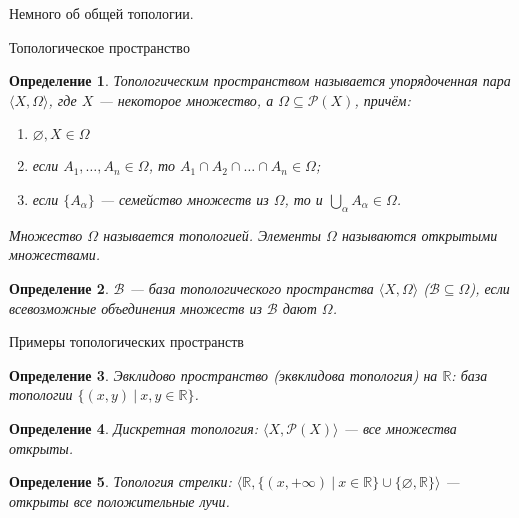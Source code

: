 \documentclass[aspectratio=169]{beamer}
\begin{document}
\newtheorem{axiom}{Аксиома}
\newtheorem{exmprus}{Пример}
\newtheorem{defrus}{Определение}
\newtheorem{lemmarus}{Лемма}
\newtheorem{thmrus}{Теорема}

\begin{frame}{}
\begin{center}\Large Немного об общей топологии.\end{center}
\end{frame}

\begin{frame}{Топологическое пространство}

\begin{defrus}Топологическим пространством называется упорядоченная пара $\langle X, \Omega \rangle$,
где $X$ --- некоторое множество, а $\Omega \subseteq \mathcal{P}(X)$, причём:
\begin{enumerate}
\item $\varnothing, X \in \Omega$
\item если $A_1, \dots, A_n \in \Omega$, то $A_1 \cap A_2 \cap \dots \cap A_n \in \Omega$;
\item если $\{A_\alpha\}$ --- семейство множеств из $\Omega$, то и $\bigcup_\alpha A_\alpha \in \Omega$.
\end{enumerate}

Множество $\Omega$ называется \emph{топологией}.
Элементы $\Omega$ называются открытыми множествами.
\end{defrus}


\begin{defrus}$\mathcal{B}$ --- \emph{база} топологического пространства $\langle X, \Omega\rangle$ ($\mathcal{B} \subseteq \Omega$), 
если всевозможные объединения множеств из $\mathcal{B}$ дают $\Omega$.
\end{defrus}
\end{frame}

\begin{frame}{Примеры топологических пространств}
\begin{defrus}Эвклидово пространство (эквклидова топология) на $\mathbb{R}$: база топологии $\{(x,y)\ |\ x,y \in \mathbb{R}\}$.\end{defrus}
\begin{defrus}Дискретная топология: $\langle X, \mathcal{P}(X) \rangle$ --- все множества открыты.\end{defrus}
\begin{defrus}Топология стрелки: $\langle \mathbb{R}, \{(x,+\infty)\ |\ x\in\mathbb{R}\}\cup\{\varnothing,\mathbb{R}\}\rangle$ --- открыты все положительные лучи.\end{defrus}
\end{frame}
\end{document}
